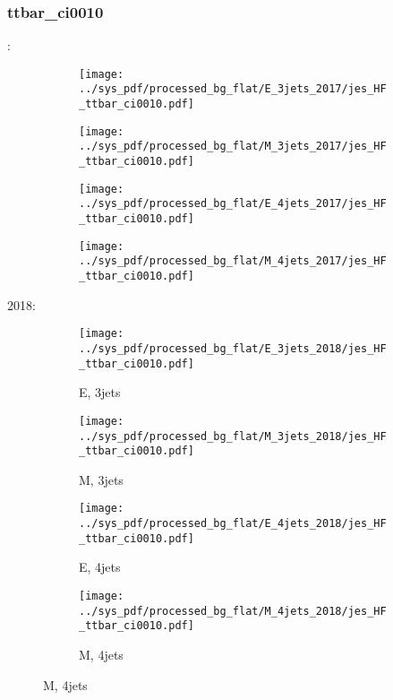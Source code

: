 \documentclass{beamer}
\begin{document}
\begin{frame}
\frametitle{ttbar_ci0010}
\fontsize{5}{1}:
\begin{figure}
\centering
\begin{subfigure}[b]{0.24\textwidth}
\texttt{[image: ../sys\_pdf/processed\_bg\_flat/E\_3jets\_2017/jes\_HF\_ttbar\_ci0010.pdf]}
\end{subfigure}
\begin{subfigure}[b]{0.24\textwidth}
\texttt{[image: ../sys\_pdf/processed\_bg\_flat/M\_3jets\_2017/jes\_HF\_ttbar\_ci0010.pdf]}
\end{subfigure}
\begin{subfigure}[b]{0.24\textwidth}
\texttt{[image: ../sys\_pdf/processed\_bg\_flat/E\_4jets\_2017/jes\_HF\_ttbar\_ci0010.pdf]}
\end{subfigure}
\begin{subfigure}[b]{0.24\textwidth}
\texttt{[image: ../sys\_pdf/processed\_bg\_flat/M\_4jets\_2017/jes\_HF\_ttbar\_ci0010.pdf]}
\end{subfigure}
\end{figure}
2018:
\begin{figure}
\centering
\begin{subfigure}[b]{0.24\textwidth}
\texttt{[image: ../sys\_pdf/processed\_bg\_flat/E\_3jets\_2018/jes\_HF\_ttbar\_ci0010.pdf]}
\captionsetup{font=tiny}
\caption{E, 3jets}
\end{subfigure}
\begin{subfigure}[b]{0.24\textwidth}
\texttt{[image: ../sys\_pdf/processed\_bg\_flat/M\_3jets\_2018/jes\_HF\_ttbar\_ci0010.pdf]}
\captionsetup{font=tiny}
\caption{M, 3jets}
\end{subfigure}
\begin{subfigure}[b]{0.24\textwidth}
\texttt{[image: ../sys\_pdf/processed\_bg\_flat/E\_4jets\_2018/jes\_HF\_ttbar\_ci0010.pdf]}
\captionsetup{font=tiny}
\caption{E, 4jets}
\end{subfigure}
\begin{subfigure}[b]{0.24\textwidth}
\texttt{[image: ../sys\_pdf/processed\_bg\_flat/M\_4jets\_2018/jes\_HF\_ttbar\_ci0010.pdf]}
\captionsetup{font=tiny}
\caption{M, 4jets}
\end{subfigure}
\end{figure}
\end{frame}
\end{document}

